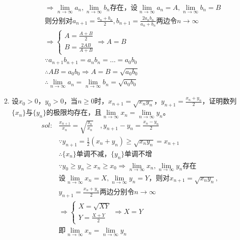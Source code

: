 \begin{enumerate}[{例}1.]
\begin{align*}
                &\Rightarrow\lim_{n\to \infty}a_n,\lim_{n\to \infty}b_n\mbox{存在}\mbox{，设}\lim_{n\to \infty}a_n=A,\lim_{n\to \infty}b_n=B\\
                &\mbox{则分别对}a_{n+1}=\frac{a_n+b_n}{2},b_{n+1}=\frac{2a_nb_n}{a_n+b_n}\mbox{两边令}n\to\infty\\
                &\Rightarrow\begin{cases}A=\frac{A+B}{2}\\
                                        B=\frac{2AB}{A+B}
                        \end{cases}\Rightarrow A=B\\
                &\because a_{n+1}b_{n+1}=a_nb_n=\dots=a_0b_0\\
                &\therefore AB=a_0b_0\Rightarrow A=B=\sqrt{a_0b_0}\\
                &\therefore \lim_{n\to \infty}a_n=\lim_{n\to\infty}b_n=\sqrt{a_0b_0}
        \end{align*}
    \item 设$x_0>0$，$y_0>0$，当$n\geq 0$时，$x_{n+1}=\sqrt{x_n y_n}$，$y_{n+1}=\frac{x_n + y_n}{2}$，证明数列$\{x_n\}$与$\{y_n\}$的极限均存在，且$\lim\limits_{n\to \infty}x_n=\lim\limits_{n \to \infty}y_n$。
        \begin{align*}
            sol:&\frac{x_{n+1}}{x_n}=\sqrt{\frac{y_n}{x_n}}\quad, y_{n+1}-y_n=\frac{x_n-y_n}{2}\\
                &\because y_{n+1}=\frac{1}{2}(x_n+y_n)\geq\sqrt{x_ny_n}=x_{n+1}\\
                &\therefore \{x_n\}\mbox{单调不减，}\{y_n\}\mbox{单调不增}\\
                &\because y_0\geq y_n\geq x_n \geq x_0\Rightarrow \lim_{n\to\infty}x_n,\lim_{n\to\infty}y_n\mbox{存在}\\
                &\mbox{设}\lim_{n\to\infty}x_n=X,\lim_{n\to\infty}y_n=Y\mbox{，则对}x_{n+1}=\sqrt{x_ny_n},\\
                &y_{n+1}=\frac{x_n+y_n}{2}\mbox{两边分别令}n\to\infty\\
                &\Rightarrow\begin{cases}X=\sqrt{XY}\\
                                        Y=\frac{X+Y}{2}
                            \end{cases}\Rightarrow X=Y\\
                &\mbox{即}\lim_{n\to\infty}x_n=\lim_{n\to\infty}y_n
        \end{align*}

\end{enumerate}

